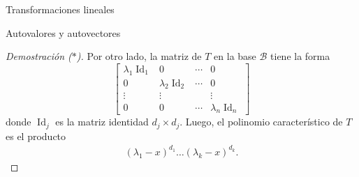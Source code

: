 \documentclass[a4paper,12pt,twoside,spanish,reqno]{amsbook}
\numberwithin{equation}{section}
\theoremstyle{definition}
\theoremstyle{remark}
\newcommand{\Id}{\operatorname{Id}}
\begin{document}
\begin{chapter}{Transformaciones lineales}
\begin{section}{Autovalores y autovectores}
\begin{proof}[Demostración ($*$)]
            Por otro lado, la matriz de $T$ en la base $\mathcal{B}$ tiene la forma
            \begin{equation*}
                \begin{bmatrix}
                \lambda_1 \Id_1 &0&\cdots&0 \\0&\lambda_2 \Id_2&\cdots&0 \\\vdots&\vdots&&\vdots \\0&0&\cdots&\lambda_n \Id_n 
                \end{bmatrix}
            \end{equation*}
            donde $\Id_j$ es la matriz identidad $d_j \times d_j$. Luego,  el polinomio característico de $T$ es el producto
            \begin{align*}
                (\lambda_1 -x)^{d_1}\ldots(\lambda_k- x)^{d_k}.
            \end{align*}
        \end{proof}
    

\end{section}
\end{chapter}
\end{document}
